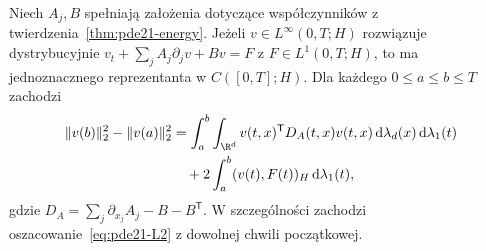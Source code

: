 \begin{lemat}
\label{lem:pde21-friedrichs-comm}
Niech $A_j,B$ spełniają założenia dotyczące
współczynników z twierdzenia~\ref{thm:pde21-energy}.
Jeżeli $v\in L^\infty(0,T;H)$ rozwiązuje dystrybucyjnie
$v_t+\sum_j A_j\partial_jv+Bv=F$ z $F\in L^1(0,T;H)$,
to ma jednoznacznego reprezentanta w $C([0,T];H)$.
Dla każdego $0\le a\le b\le T$ zachodzi
\[
 \begin{split}
 \|v(b)\|_2^2-\|v(a)\|_2^2
 &=\int_a^b\int_{\R^d}v(t,x)^\mathsf TD_A(t,x)v(t,x)
       \,\mathrm d\lambda_d(x)\,\mathrm d\lambda_1(t)\\
 &\quad+2\int_a^b(v(t),F(t))_H\,\mathrm d\lambda_1(t),
 \end{split}
\]
gdzie $D_A=\sum_j\partial_{x_j}A_j-B-B^\mathsf T$.
W szczególności zachodzi oszacowanie~\eqref{eq:pde21-L2}
z dowolnej chwili początkowej.
\end{lemat}
